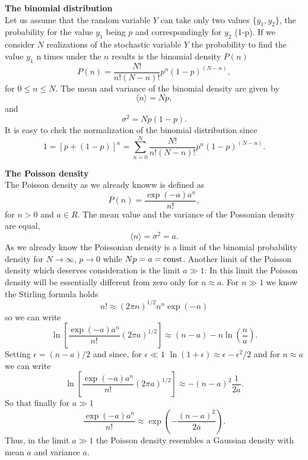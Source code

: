 {\bf The binomial distribution} \\
Let us assume that the random variable $Y$ 
can take only two values $\{y_1,y_2\}$, the probability for the 
value $y_1$ being $p$ and correspondingly for $y_2$ (1-p). If we 
consider $N$ realizations of the stochastic variable $Y$ the 
probability to find the value $y_1$ n times under the $n$ results
is the binomial density $P(n)$
\begin{equation}
P(n) = \frac{N!}{n!(N-n)!} p^n(1-p)^{(N-n)},
\end{equation}
for $0 \le n \le N$.
The mean and variance of the binomial density are given by
\begin{equation}
\langle n \rangle = Np,
\end{equation}
and
\begin{equation}
\sigma^2 = Np(1-p).
\end{equation}
It is easy to chek the normalization of the binomial distribution since
\begin{equation}
1 = [p + (1-p)]^n = \sum_{n=0}^N \frac{N!}{n! (N-n)!}
        p^n (1-p)^{(N-n)}.
\end{equation}

{\bf The Poisson density} \\
The Poisson density as we already knoww
is defined as
\begin{equation}
P(n) = \frac{\exp(-a) a^n}{n!},
\end{equation}
for $n > 0$ and $a \in R$. The mean value and the variance
of the Possonian density are equal,
\begin{equation}
\langle n \rangle = \sigma^2 = a.
\end{equation}
As we already know the Poissonian density is a limit of the 
binomial probability density for $N \rightarrow \infty$, $p \rightarrow 
0$ while $Np=a={\rm const}$. Another limit of the Poisson density
which deserves consideration is the limit $a \gg 1$: In this limit
the Poisson density will be essentially different from zero only 
for $n \approx a$. For $n \gg 1$ we know the Stirling formula 
holds
\begin{equation}
n! \approx (2 \pi n)^{1/2} n^n \exp(-n)
\end{equation}
so we can write
\begin{equation}
\ln\left[ \frac{\exp(-a) a^n}{n!} (2\pi a)^{1/2} \right] 
\approx (n-a) -n\ln\left(\frac{n}{a}\right).
\end{equation}
Setting $\epsilon=(n-a)/2$ and since, 
for $\epsilon \ll 1$ $\ln(1+\epsilon) \approx \epsilon -
\epsilon^2/2$ and for $n\approx a$
we can write
\begin{equation}
\ln\left[ \frac{\exp(-a) a^n}{n!} (2\pi a)^{1/2} \right] \approx
-(n-a)^2\frac{1}{2a}.
\end{equation}
So that finally for $a \gg 1$
\begin{equation}
\frac{\exp(-a) a^n}{n!} \approx \exp\left( - 
\frac{(n-a)^2}{2a}\right).
\end{equation}
Thus, in the limit $a \gg 1$ the Poisson density resembles a
Gaussian density with mean $a$ and variance $a$.

